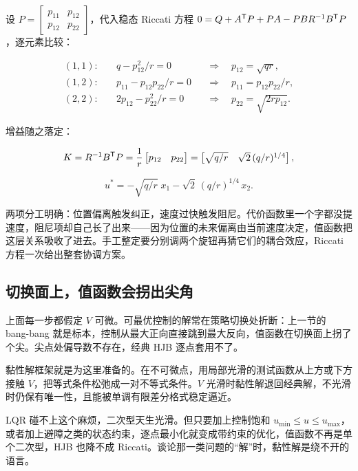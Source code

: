 设 \(P = \begin{bmatrix} p_{11} & p_{12} \\ p_{12} & p_{22}\end{bmatrix}\)，代入稳态 Riccati 方程 \(0 = Q + A^{\mathsf{T}}P + PA - PBR^{-1}B^{\mathsf{T}}P\)，逐元素比较：

\[
\begin{aligned}
(1,1):&\quad q - p_{12}^2/r = 0 &&\Longrightarrow\quad p_{12} = \sqrt{qr}, \\
(1,2):&\quad p_{11} - p_{12}p_{22}/r = 0 &&\Longrightarrow\quad p_{11} = p_{12}p_{22}/r, \\
(2,2):&\quad 2p_{12} - p_{22}^2/r = 0 &&\Longrightarrow\quad p_{22} = \sqrt{2 r p_{12}} .
\end{aligned}
\]

增益随之落定：

\[
K = R^{-1}B^{\mathsf{T}}P = \frac1r \begin{bmatrix} p_{12} & p_{22}\end{bmatrix}
= \begin{bmatrix} \sqrt{q/r} & \sqrt{2}\,(q/r)^{1/4} \end{bmatrix},
\]

\[
u^* = -\sqrt{q/r}\; x_1 - \sqrt{2}\,(q/r)^{1/4}\, x_2 .
\]

两项分工明确：位置偏离触发纠正，速度过快触发阻尼。代价函数里一个字都没提速度，阻尼项却自己长了出来——因为位置的未来偏离由当前速度决定，值函数把这层关系吸收了进去。手工整定要分别调两个旋钮再猜它们的耦合效应，Riccati 方程一次给出整套协调方案。

\subsection{切换面上，值函数会拐出尖角}

上面每一步都假定 \(V\) 可微。可最优控制的解常在策略切换处折断：上一节的 bang-bang 就是标本，控制从最大正向直接跳到最大反向，值函数在切换面上拐了个尖。尖点处偏导数不存在，经典 HJB 逐点套用不了。

黏性解框架就是为这里准备的。在不可微点，用局部光滑的测试函数从上方或下方接触 \(V\)，把等式条件松弛成一对不等式条件。\(V\) 光滑时黏性解退回经典解，不光滑时仍保有唯一性，且能被单调有限差分格式稳定逼近。

LQR 碰不上这个麻烦，二次型天生光滑。但只要加上控制饱和 \(u_{\min}\le u\le u_{\max}\)，或者加上避障之类的状态约束，逐点最小化就变成带约束的优化，值函数不再是单个二次型，HJB 也降不成 Riccati。谈论那一类问题的``解''时，黏性解是绕不开的语言。

